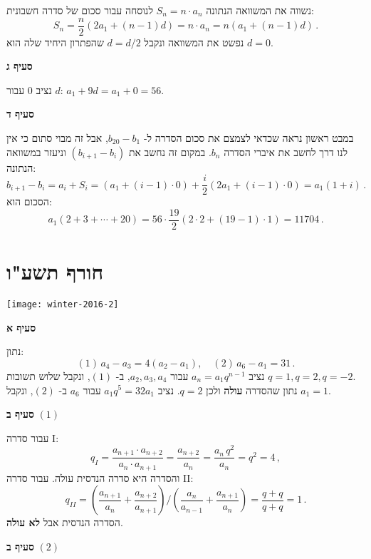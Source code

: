 נשווה את המשוואה הנתונה
$S_n=n\cdot a_n$
לנוסחה עבור סכום של סדרה חשבונית:
\[
S_n=\frac{n}{2}(2a_1+(n-1)d)=n\cdot a_n= n(a_1+(n-1)d) \,.
\]
נפשט את המשוואה ונקבל 
$d=d/2$
שהפתרון היחיד שלה הוא
$d=0$.

\textbf{סעיף ג}

נציב
$0$
עבור 
$d$:
$a_1+9d=a_1+0=56$.

\textbf{סעיף ד}

במבט ראשון נראה שכדאי לצמצם את סכום הסדרה  ל-%
$b_{20}-b_1$,
אבל זה מבוי סתום כי אין לנו דרך לחשב את איברי הסדרה
$b_n$.
במקום זה נחשב את 
$(b_{i+1}-b_i)$
וניעזר במשוואה הנתונה:
\[
b_{i+1}-b_i=a_i+S_i=(a_1+(i-1)\cdot 0)+\frac{i}{2}(2a_1+(i-1)\cdot 0)=a_1(1+i)\,.
\]
הסכום הוא:
\[
a_1(2+3+\cdots+20)=56\cdot\frac{19}{2}(2\cdot 2 + (19-1)\cdot 1)=11704\,.
\]

\np
\section{חורף תשע"ו}

\begin{center}
\texttt{[image: winter-2016-2]}
\end{center}

\vspace{-3ex}

\textbf{סעיף א}

נתון:
\[
(1)\, a_4-a_3 = 4 (a_2-a_1),\quad (2)\, a_6 - a_1 = 31\,.
\]
נציב
$a_n=a_1q^{n-1}$ 
עבור
$a_2, a_3, a_4$,
ב-%
$(1)$,
ונקבל שלוש תשובות
$q=1,q=2,q=-2$.\\
נתון שהסדרה 
\textbf{עולה}
ולכן
$q=2$.
נציב 
$a_1q^5=32 a_1$
עבור
$a_6$
ב-%
$(2)$,
ונקבל
$a_1=1$.

\textbf{סעיף ב} 
$(1)$

עבור סדרה I:
\[
q_I=\frac{a_{n+1}\cdot a_{n+2}}{a_n\cdot a_{n+1}}=\frac{a_{n+2}}{a_n}=\frac{a_n\,q^2}{a_n}=q^2=4\,,
\]
והסדרה היא סדרה הנדסית עולה. עבור סדרה II:
\[
q_{II}=\left(\frac{a_{n+1}}{a_n} + \frac{a_{n+2}}{a_{n+1}}\right) / \left(\frac{a_{n}}{a_{n-1}} + \frac{a_{n+1}}{a_{n}}\right)=\frac{q+q}{q+q}=1\,.
\]
הסדרה הנדסית אבל
\textbf{לא עולה}.

\textbf{סעיף ב}
$(2)$


